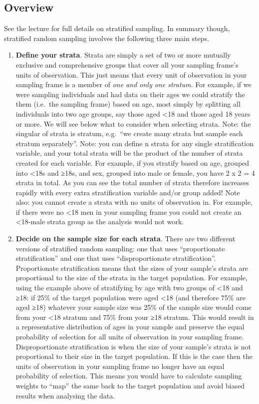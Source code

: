 \documentclass[
]{book}
\begin{document}
\hypertarget{overview-2}{%
\subsection{Overview}\label{overview-2}}

See the lecture for full details on stratified sampling. In summary though, stratified random sampling involves the following three main steps.

\begin{enumerate}
\def\labelenumi{\arabic{enumi}.}
\item
  \textbf{Define your strata}. Strata are simply a set of two or more mutually exclusive and comprehensive groups that cover all your sampling frame's units of observation. This just means that every unit of observation in your sampling frame is a member of \emph{one and only one stratum}. For example, if we were sampling individuals and had data on their ages we could stratify the them (i.e.~the sampling frame) based on age, most simply by splitting all individuals into two age groups, say those aged \textless18 and those aged 18 years or more. We will see below what to consider when selecting strata. Note: the singular of strata is stratum, e.g.~``we create many strata but sample each stratum separately''. Note: you can define n strata for any single stratification variable, and your total strata will be the product of the number of strata created for each variable. For example, if you stratify based on age, grouped into \textless18s and ≥18s, and sex, grouped into male or female, you have 2 x 2 = 4 strata in total. As you can see the total number of strata therefore increases rapidly with every extra stratification variable and/or group added! Note also: you cannot create a strata with no units of observation in. For example, if there were no \textless18 men in your sampling frame you could not create an \textless18-male strata group as the analysis would not work.
\item
  \textbf{Decide on the sample size for each strata}. There are two different versions of stratified random sampling: one that uses ``proportionate stratification'' and one that uses ``disproportionate stratification''. Proportionate stratification means that the sizes of your sample's strata are proportional to the size of the strata in the target population. For example, using the example above of stratifying by age with two groups of \textless18 and ≥18: if 25\% of the target population were aged \textless18 (and therefore 75\% are aged ≥18) whatever your sample size was 25\% of the sample size would come from your \textless18 stratum and 75\% from your ≥18 stratum. This would result in a representative distribution of ages in your sample and preserve the equal probability of selection for all units of observation in your sampling frame. Disproportionate stratification is when the size of your sample's strata is not proportional to their size in the target population. If this is the case then the units of observation in your sampling frame no longer have an equal probability of selection. This means you would have to calculate sampling weights to ``map'' the same back to the target population and avoid biased results when analysing the data.

\end{enumerate}
\end{document}
